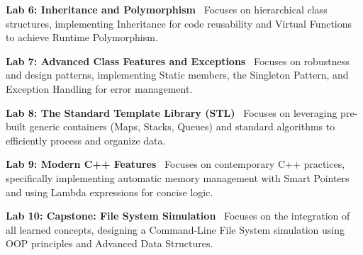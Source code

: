 \vspace{0.2cm}

\noindent\textbf{Lab 6: Inheritance and Polymorphism} \
Focuses on hierarchical class structures, implementing Inheritance for code reusability and Virtual Functions to achieve Runtime Polymorphism. \\

\vspace{0.2cm}

\noindent\textbf{Lab 7: Advanced Class Features and Exceptions} \
Focuses on robustness and design patterns, implementing Static members, the Singleton Pattern, and Exception Handling for error management. \\

\vspace{0.2cm}

\noindent\textbf{Lab 8: The Standard Template Library (STL)} \
Focuses on leveraging pre-built generic containers (Maps, Stacks, Queues) and standard algorithms to efficiently process and organize data. \\

\vspace{0.2cm}

\noindent\textbf{Lab 9: Modern C++ Features} \
Focuses on contemporary C++ practices, specifically implementing automatic memory management with Smart Pointers and using Lambda expressions for concise logic. \\

\vspace{0.2cm}

\noindent\textbf{Lab 10: Capstone: File System Simulation} \
Focuses on the integration of all learned concepts, designing a Command-Line File System simulation using OOP principles and Advanced Data Structures.

\vspace{0.2cm}

\newpage
\rhead{Curriculum Schema}
